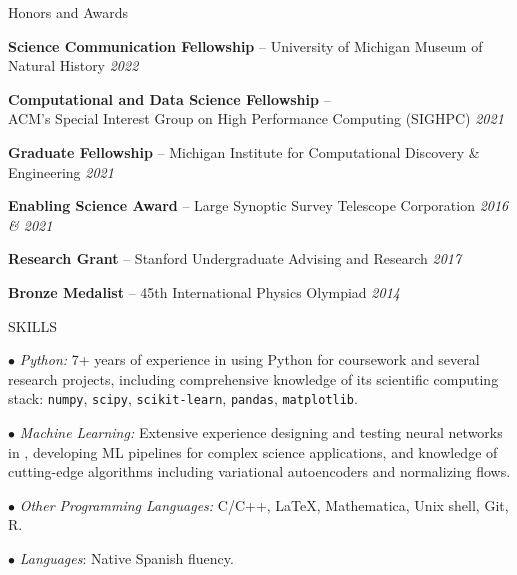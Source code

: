\newpage

\begin{rSection}{Honors and Awards} \itemsep -3pt \vspace*{-.25cm}

\item \textbf{Science Communication Fellowship} -- University of Michigan Museum of Natural History \hfill{\em 2022}

\item \textbf{Computational and Data Science Fellowship} -- \\ ACM’s Special Interest Group on High Performance Computing (SIGHPC) \hfill {\em 2021}

\item \textbf{Graduate Fellowship} -- Michigan Institute for Computational Discovery \& Engineering  \hfill {\em 2021}

\item \textbf{Enabling Science Award} -- Large Synoptic Survey Telescope Corporation \hfill {\em 2016 \& 2021}

\item \textbf{Research Grant} -- Stanford Undergraduate Advising and Research \hfill {\em 2017}

\item \textbf{Bronze Medalist} -- 45th International Physics Olympiad \hfill {\em 2014}
\end{rSection}
\begin{rSection}{SKILLS}
\vspace*{-0.3cm}
\item {\small $\bullet$} \textit{Python:} 7+ years of experience in using Python for coursework and several research projects, including comprehensive knowledge of its scientific computing stack: \texttt{numpy}, \texttt{scipy}, \texttt{scikit-learn}, \texttt{pandas}, \texttt{matplotlib}.

\item {\small $\bullet$} \textit{Machine Learning:} Extensive experience designing and testing neural networks in \pytorch, developing ML pipelines for complex science applications, and knowledge of cutting-edge algorithms including variational autoencoders and normalizing flows.

\item {\small $\bullet$} \textit{Other Programming Languages:} C/C++, \LaTeX, Mathematica, Unix shell, Git, R.

\item {\small $\bullet$} \textit{Languages}: Native Spanish fluency.
\end{rSection}


